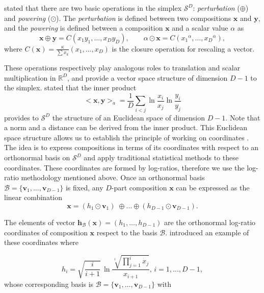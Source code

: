 \documentclass[12pt, a4paper]{article}
\begin{document}
 \noindent \cite{aitchison1986statistical} stated that  there are two basic operations in the simplex $\mathcal{S}^D$: \emph{perturbation} ($\oplus$) and 
 \emph{powering} ($\odot$). The \emph{perturbation} is defined between two compositions $\textbf{x}$ 
and $\textbf{y}$,  and the \emph{powering} is defined between a composition $\textbf{x}$ and a scalar value $\alpha$ as
\begin{equation}
\textbf{x} \oplus \textbf{y} =  C( x_1 y_1, \dots, x_D y_D), \qquad \alpha
 \odot \textbf{x} =  C( {x_1}^\alpha, \dots, {x_D}^\alpha),
\label{pert_pow}
\end{equation}
where $C(\textbf{x})=\frac{\kappa}{\sum x_k}(x_1, \dots, x_D) $ is the closure operation for rescaling a vector.

These operations respectively play analogous roles to translation and scalar multiplication in $\mathbb{R}^D$, and provide a vector space
structure of dimension $D-1$ to the simplex. \cite{pawlowsky2001geometric} stated that the inner product 
\begin{equation}
<\textbf{x}, \textbf{y}>_a = \frac{1}{D} \sum_{i < j} \ln \frac{x_i}{x_j} \ln \frac{y_i}{y_j}
\label{inner_prod}
\end{equation}
 provides to $\mathcal{S}^D$ the structure of an Euclidean space of dimension $D-1$. Note that a norm and a distance can be derived from the inner product.
This Euclidean space structure allows us to establish the principle of working on coordinates \citep{figueras2011principle}. The idea is to express compositions in terms of its coordinates with respect to an orthonormal basis on $\mathcal{S}^D$ and apply
traditional statistical methods to these coordinates. These coordinates are formed by log-ratios, therefore we use the log-ratio methodology mentioned above. Once an orthonormal basis $\mathcal{B} = \{\textbf{v}_1, \dots, \textbf{v}_{D-1}\}$ is fixed, any $D$-part composition $\textbf{x}$ can be expressed as the linear combination
\[
\textbf{x} = (h_1 \odot \textbf{v}_1)\; \oplus \dots  \oplus (h_{D-1} \odot \textbf{v}_{D-1}).
\]

The elements of vector $\textbf{h}_\mathcal{B}(\textbf{x})=(h_1, \dots, h_{D-1})$ are the orthonormal log-ratio coordinates of composition $\textbf{x}$ respect to the basis $\mathcal{B}$. \cite{egozcue2003isometric} introduced an example of these coordinates where

\begin{equation}
\label{eilr}
h_i=\sqrt{\frac{i}{i+1}}\,\ln\frac{\sqrt[i]
{\prod_{j=1}^{i} x_j}}{x_{i+1}},\,i=1,\dots,D-1,
\end{equation}
whose corresponding basis is $\mathcal{B} = \{\textbf{v}_1, \dots, \textbf{v}_{D-1}\}$ with
\end{document}
